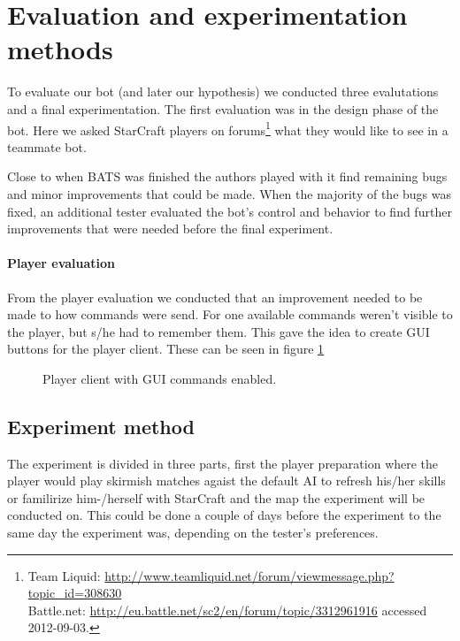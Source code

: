 \section{Evaluation and experimentation methods}
To evaluate our bot (and later our hypothesis) we conducted three evalutations and a final experimentation. The first evaluation was in the design phase of the bot. Here we asked StarCraft players on forums\footnote{
Team Liquid: \url{http://www.teamliquid.net/forum/viewmessage.php?topic_id=308630}\\
Battle.net: \url{http://eu.battle.net/sc2/en/forum/topic/3312961916} accessed 2012-09-03.} what they would like to see in a teammate bot.

Close to when BATS was finished the authors played with it find remaining bugs and minor improvements that could be made. When the majority of the bugs was fixed, an additional tester evaluated the bot’s control and behavior to find further improvements that were needed before the final experiment.

\paragraph{Player evaluation}
From the player evaluation we conducted that an improvement needed to be made to how commands were send. For one available commands weren’t visible to the player, but s/he had to remember them. This gave the idea to create GUI buttons for the player client. These can be seen in figure \ref{fig:player_commands_gui}

\begin{figure}[htb]
\centering
\caption{Player client with GUI commands enabled.}
\label{fig:player_commands_gui}
\end{figure}

\subsection{Experiment method}
The experiment is divided in three parts, first the player preparation where the player would play skirmish matches agaist the default AI to refresh his/her skills or familirize him-/herself with StarCraft and the map the experiment will be conducted on. This could be done a couple of days before the experiment to the same day the experiment was, depending on the tester’s preferences.


